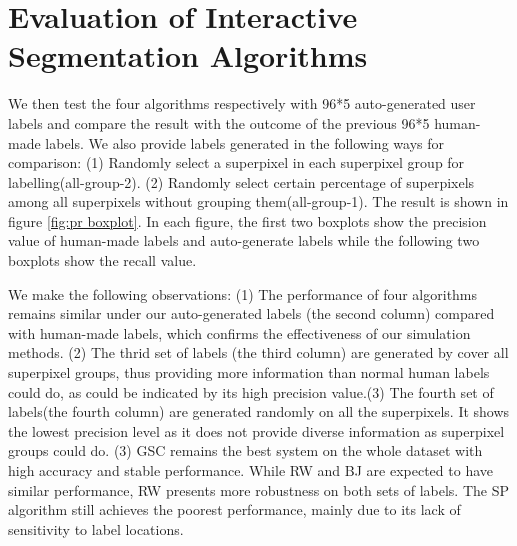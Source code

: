 \documentclass[runningheads,a4paper]{llncs}
\begin{document}
\section{Evaluation of Interactive Segmentation Algorithms}
We then test the four algorithms respectively with 96*5 auto-generated user labels and compare the result with the outcome of the previous 96*5 human-made labels. We also provide labels generated in the following ways for comparison: (1) Randomly select a superpixel in each superpixel group for labelling(all-group-2). (2) Randomly select certain percentage of superpixels among all superpixels without grouping them(all-group-1).
The result is shown in figure \ref{fig:pr boxplot}. In each figure, the first two boxplots show the precision value of human-made labels and auto-generate labels while the following two boxplots show the recall value.

We make the following observations: (1) The performance of four algorithms remains similar under our auto-generated labels (the second column) compared with human-made labels, which confirms the effectiveness of our simulation methods. (2) The thrid set of labels (the third column) are generated by cover all superpixel groups, thus providing more information than normal human labels could do, as could be indicated by its high precision value.(3) The fourth set of labels(the fourth column)  are generated randomly on all the superpixels. It shows the lowest precision level as it does not provide diverse information as superpixel groups could do.  (3) GSC \cite{gulshan2010geodesic} remains the best system on the whole dataset with high accuracy and stable performance. While RW \cite {grady2006random} and BJ \cite{boykov2001interactive}are expected to have similar performance, RW presents more robustness on both sets of labels. The SP\cite{bai2007geodesic} algorithm still achieves the poorest performance, mainly due to its lack of sensitivity to label locations.
\end{document}
